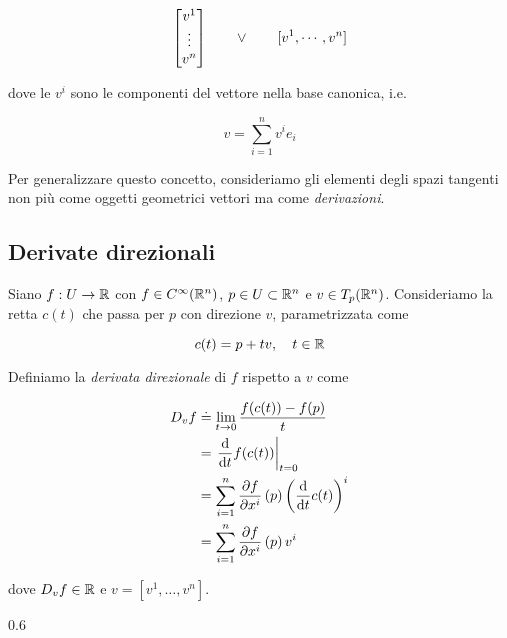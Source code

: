\begin{equation}
	\bmqty{ v^{1} \\ \vdots \\ v^{n} } \qquad \lor \qquad [v^{1}, \cdots, v^{n}]
\end{equation}

dove le $ v^{i} $ sono le componenti del vettore nella base canonica, i.e.

\begin{equation}
	v = \sum_{i=1}^{n} v^{i} e_{i}
\end{equation}

Per generalizzare questo concetto, consideriamo gli elementi degli spazi tangenti non più come oggetti geometrici vettori ma come \textit{derivazioni}.

\subsection{Derivate direzionali}

Siano $ f : U \to \mathbb{R} $ con $ f \in C^{\infty}(\mathbb{R}^{n}) $, $ p\in U \subset \mathbb{R}^{n} $ e $ v \in T_{p}(\mathbb{R}^{n}) $. Consideriamo la retta $ c(t) $ che passa per $ p $ con direzione $ v $, parametrizzata come

\begin{equation}
	c(t) = p + t v \qcomma t \in \R
\end{equation}

Definiamo la \textit{derivata direzionale} di $ f $ rispetto a $ v $ come

\begin{align}
	\begin{split}
		D_{v} f &\doteq \lim_{t \to 0} \dfrac{f(c(t)) - f(p)}{t} \\
		&= \left. \dv{t} f(c(t)) \right|_{t=0} \\
		&= \sum_{i=1}^{n} \pdv{f}{x^{i}} \, (p) \left( \dv{t} c(t) \right)^{i} \\
		&= \sum_{i=1}^{n} \pdv{f}{x^{i}} \, (p) \, v^{i}
	\end{split}
\end{align}

dove $ D_{v} f \in \mathbb{R} $ e $ v = [v^{1},\dots,v^{n}] $.

	{0.6}{%
			}

